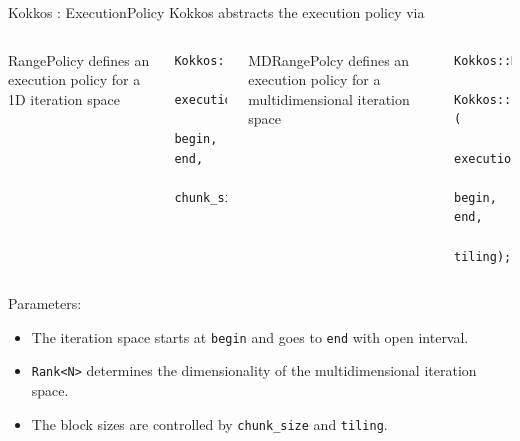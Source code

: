 \begin{frame}[fragile]{Kokkos : Execution}{Policy}
  Kokkos abstracts the execution policy via

  \begin{columns}
      \begin{block}{RangePolicy}
        defines an execution policy for a 1D iteration space
      \end{block}
      \begin{verbatim}
Kokkos::RangePolicy(
  execution_space, 
  begin, end, 
  chunk_size);
      \end{verbatim}
      \begin{block}{MDRangePolcy}
        defines an execution policy for a multidimensional iteration space
      \end{block}
      \begin{verbatim}
Kokkos::MDRangePolicy<
  Kokkos::Rank<N>>(
    execution_space, 
    begin, end, 
    tiling);
  \end{verbatim}
  \end{columns}

  \begin{bkblock}{Parameters:}
    \begin{itemize}
      \item The iteration space starts at \verb|begin| and goes to \verb|end| with open interval.
      \item \verb|Rank<N>| determines the dimensionality of the multidimensional iteration space.
      \item The block sizes are controlled by \verb|chunk_size| and \verb|tiling|.
    \end{itemize}
  \end{bkblock}
\end{frame}

